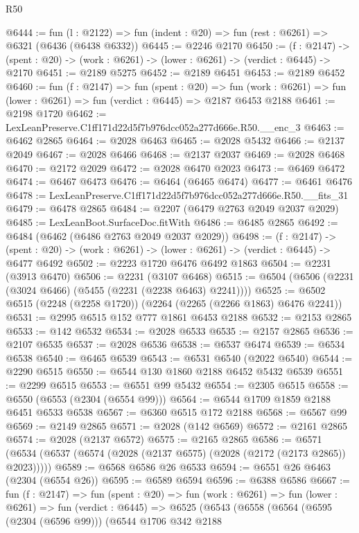 \begin{lexlean}{R50}
\begin{coremodule}
@6444 := fun (l : @2122) => fun (indent : @20) => fun (rest : @6261) => @6321 (@6436 (@6438 @6332))
@6445 := @2246 @2170
@6450 := (f : @2147) ->
  (spent : @20) -> (work : @6261) -> (lower : @6261) -> (verdict : @6445) -> @2170
@6451 := @2189 @5275
@6452 := @2189 @6451
@6453 := @2189 @6452
@6460 := fun (f : @2147) =>
  fun (spent : @20) =>
  fun (work : @6261) => fun (lower : @6261) => fun (verdict : @6445) => @2187 @6453 @2188
@6461 := @2198 @1720
@6462 := LexLeanPreserve.C1ff171d22d5f7b976dcc052a277d666e.R50.__enc_3
@6463 := @6462 @2865
@6464 := @2028 @6463
@6465 := @2028 @5432
@6466 := @2137 @2049
@6467 := @2028 @6466
@6468 := @2137 @2037
@6469 := @2028 @6468
@6470 := @2172 @2029
@6472 := @2028 @6470 @2023
@6473 := @6469 @6472
@6474 := @6467 @6473
@6476 := @6464 (@6465 @6474)
@6477 := @6461 @6476
@6478 := LexLeanPreserve.C1ff171d22d5f7b976dcc052a277d666e.R50.__fits_31
@6479 := @6478 @2865
@6484 := @2207 (@6479 @2763 @2049 @2037 @2029)
@6485 := LexLeanBoot.SurfaceDoc.fitWith
@6486 := @6485 @2865
@6492 := @6484 (@6462 (@6486 @2763 @2049 @2037 @2029))
@6498 := (f : @2147) ->
  (spent : @20) -> (work : @6261) -> (lower : @6261) -> (verdict : @6445) -> @6477 @6492
@6502 := @2223 @1720 @6476 @6492 @1863
@6504 := @2231 (@3913 @6470)
@6506 := @2231 (@3107 @6468)
@6515 := @6504 (@6506 (@2231 (@3024 @6466) (@5455 (@2231 (@2238 @6463) @2241))))
@6525 := @6502 @6515 (@2248 (@2258 @1720)) (@2264 (@2265 (@2266 @1863) @6476 @2241))
@6531 := @2995 @6515 @152 @777 @1861 @6453 @2188
@6532 := @2153 @2865
@6533 := @142 @6532
@6534 := @2028 @6533
@6535 := @2157 @2865
@6536 := @2107 @6535
@6537 := @2028 @6536
@6538 := @6537 @6474
@6539 := @6534 @6538
@6540 := @6465 @6539
@6543 := @6531 @6540 (@2022 @6540)
@6544 := @2290 @6515
@6550 := @6544 @130 @1860 @2188 @6452 @5432 @6539
@6551 := @2299 @6515
@6553 := @6551 @99 @5432
@6554 := @2305 @6515
@6558 := @6550 (@6553 (@2304 (@6554 @99)))
@6564 := @6544 @1709 @1859 @2188 @6451 @6533 @6538
@6567 := @6360 @6515 @172 @2188
@6568 := @6567 @99
@6569 := @2149 @2865
@6571 := @2028 (@142 @6569)
@6572 := @2161 @2865
@6574 := @2028 (@2137 @6572)
@6575 := @2165 @2865
@6586 := @6571 (@6534 (@6537 (@6574 (@2028 (@2137 @6575) (@2028 (@2172 (@2173 @2865)) @2023)))))
@6589 := @6568 @6586 @26 @6533
@6594 := @6551 @26 @6463 (@2304 (@6554 @26))
@6595 := @6589 @6594
@6596 := @6388 @6586
@6667 := fun (f : @2147) =>
  fun (spent : @20) =>
  fun (work : @6261) =>
  fun (lower : @6261) =>
  fun (verdict : @6445) =>
  @6525
    (@6543
      (@6558
        (@6564
          (@6595 (@2304 (@6596 @99)))
          (@6544
            @1706
            @342
            @2188

\end{coremodule}
\end{lexlean}
